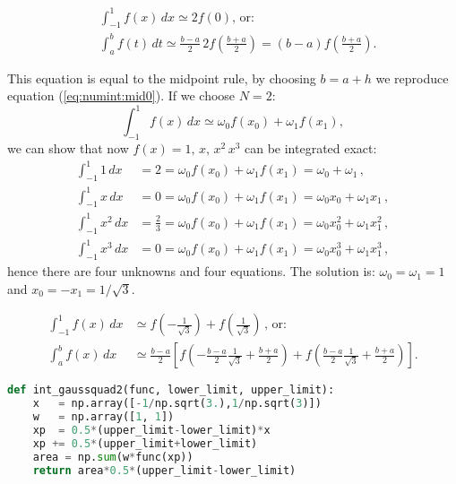 \documentclass[graybox,sectrefs,envcountresetchap,open=right,final]{svmonodo}
\newenvironment{graybox2admon}[1][]{
\begin{graybox2mdframed}[frametitle=#1]
}
{
\end{graybox2mdframed}
}
\begin{document}
\begin{graybox2admon}[The Gaussian integration rule for $N=1$ is:]

\begin{align}
&\int_{-1}^{1}f(x)\,dx\simeq 2f(0)\text{, or: }\nonumber\\ 
&\int_{a}^{b}f(t)\,dt\simeq\frac{b-a}{2}\,2f(\frac{b+a}{2})=(b-a)f(\frac{b+a}{2}).
\end{align}
\end{graybox2admon}




This equation is equal to the midpoint rule, by choosing $b=a+h$ we reproduce equation (\ref{eq:numint:mid0}). If we choose $N=2$:
\begin{equation}
\int_{-1}^{1}f(x)\,dx\simeq\omega_0f(x_0)+\omega_1f(x_1),
\end{equation}
we can show that now $ f(x)=1,\,x,\,x^2\,x^3$ can be integrated exact:
\begin{align}
\int_{-1}^{1}1\,dx&=2=\omega_0f(x_0)+\omega_1f(x_1)=\omega_0+\omega_1\,,\\ 
\int_{-1}^{1}x\,dx&=0=\omega_0f(x_0)+\omega_1f(x_1)=\omega_0x_0+\omega_1x_1\,,\\ 
\int_{-1}^{1}x^2\,dx&=\frac{2}{3}=\omega_0f(x_0)+\omega_1f(x_1)=\omega_0x_0^2+\omega_1x_1^2\,,\\ 
\int_{-1}^{1}x^3\,dx&=0=\omega_0f(x_0)+\omega_1f(x_1)=\omega_0x_0^3+\omega_1x_1^3\,,
\end{align}
hence there are four unknowns and four equations. The solution is: $\omega_0=\omega_1=1$ and $x_0=-x_1=1/\sqrt{3}$.



\begin{graybox2admon}[The Gaussian integration rule for $N=2$ is:]
\begin{align}
\int_{-1}^{1}f(x)\,dx&\simeq f(-\frac{1}{\sqrt{3}})+f(\frac{1}{\sqrt{3}})\, \text{, or:}\\ 
\int_{a}^{b}f(x)\,dx&\simeq \frac{b-a}{2}\left[f(-\frac{b-a}{2}\frac{1}{\sqrt{3}}+\frac{b+a}{2})
+f(\frac{b-a}{2}\frac{1}{\sqrt{3}}+\frac{b+a}{2})\right].
\end{align}
\end{graybox2admon}












\begin{lstlisting}[language=python,style=blue1]
def int_gaussquad2(func, lower_limit, upper_limit):
    x   = np.array([-1/np.sqrt(3.),1/np.sqrt(3)])
    w   = np.array([1, 1])
    xp  = 0.5*(upper_limit-lower_limit)*x
    xp += 0.5*(upper_limit+lower_limit)
    area = np.sum(w*func(xp))
    return area*0.5*(upper_limit-lower_limit)

\end{lstlisting}
\end{document}
